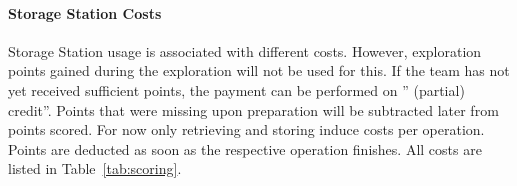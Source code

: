\documentclass[12pt,twoside]{article}
\newcommand{\reftab}[1]{Table~\ref{#1}}
\begin{document}
\paragraph{Storage Station Costs}
Storage Station usage is associated with different costs.
However, exploration points gained during the exploration will not be
used for this. If the team has not yet received sufficient points,
the payment can be performed on '' (partial) credit''. Points that were
missing upon preparation will be subtracted later from points scored.
For now only retrieving and storing induce costs per operation.
Points are deducted as soon as the respective operation finishes.
All costs are listed in \reftab{tab:scoring}.
\end{document}
